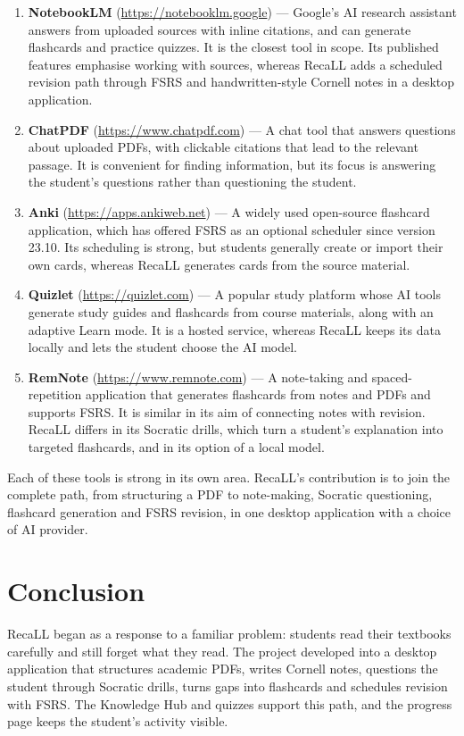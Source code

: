 \documentclass[12pt,a4paper]{article}
\begin{document}
\begin{enumerate}[leftmargin=*]
  \item \textbf{NotebookLM} (\url{https://notebooklm.google}) --- Google's AI research assistant
  answers from uploaded sources with inline citations, and can generate flashcards and practice quizzes.
  It is the closest tool in scope. Its published features emphasise working with sources, whereas RecaLL
  adds a scheduled revision path through FSRS and handwritten-style Cornell notes in a desktop application.
  \item \textbf{ChatPDF} (\url{https://www.chatpdf.com}) --- A chat tool that answers questions about
  uploaded PDFs, with clickable citations that lead to the relevant passage. It is convenient for finding
  information, but its focus is answering the student's questions rather than questioning the student.
  \item \textbf{Anki} (\url{https://apps.ankiweb.net}) --- A widely used open-source flashcard application,
  which has offered FSRS as an optional scheduler since version 23.10. Its scheduling is strong, but students
  generally create or import their own cards, whereas RecaLL generates cards from the source material.
  \item \textbf{Quizlet} (\url{https://quizlet.com}) --- A popular study platform whose AI tools generate
  study guides and flashcards from course materials, along with an adaptive Learn mode. It is a hosted
  service, whereas RecaLL keeps its data locally and lets the student choose the AI model.
  \item \textbf{RemNote} (\url{https://www.remnote.com}) --- A note-taking and spaced-repetition application
  that generates flashcards from notes and PDFs and supports FSRS. It is similar in its aim of connecting notes
  with revision. RecaLL differs in its Socratic drills, which turn a student's explanation into targeted
  flashcards, and in its option of a local model.
\end{enumerate}

Each of these tools is strong in its own area. RecaLL's contribution is to join the complete path, from
structuring a PDF to note-making, Socratic questioning, flashcard generation and FSRS revision, in one desktop
application with a choice of AI provider.

\section{Conclusion}
RecaLL began as a response to a familiar problem: students read their textbooks carefully and still forget
what they read. The project developed into a desktop application that structures academic PDFs, writes Cornell
notes, questions the student through Socratic drills, turns gaps into flashcards and schedules revision with
FSRS. The Knowledge Hub and quizzes support this path, and the progress page keeps the student's activity visible.
\end{document}
